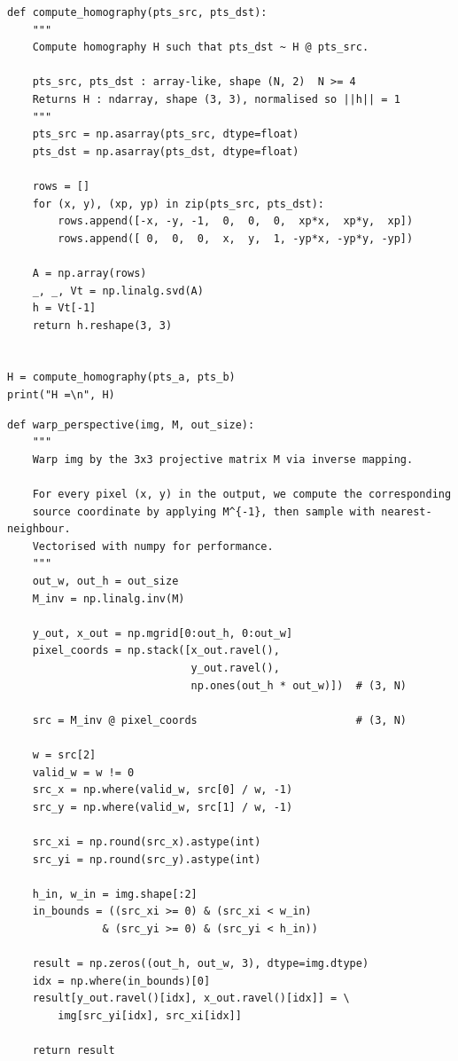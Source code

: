 \documentclass[12pt,a4paper]{article}
\begin{document}
\begin{lstlisting}[caption={Cálculo da homografia via DLT/SVD.}]
def compute_homography(pts_src, pts_dst):
    """
    Compute homography H such that pts_dst ~ H @ pts_src.

    pts_src, pts_dst : array-like, shape (N, 2)  N >= 4
    Returns H : ndarray, shape (3, 3), normalised so ||h|| = 1
    """
    pts_src = np.asarray(pts_src, dtype=float)
    pts_dst = np.asarray(pts_dst, dtype=float)

    rows = []
    for (x, y), (xp, yp) in zip(pts_src, pts_dst):
        rows.append([-x, -y, -1,  0,  0,  0,  xp*x,  xp*y,  xp])
        rows.append([ 0,  0,  0,  x,  y,  1, -yp*x, -yp*y, -yp])

    A = np.array(rows)
    _, _, Vt = np.linalg.svd(A)
    h = Vt[-1]
    return h.reshape(3, 3)


H = compute_homography(pts_a, pts_b)
print("H =\n", H)
\end{lstlisting}

\begin{lstlisting}[caption={Warping manual por mapeamento inverso.}]
def warp_perspective(img, M, out_size):
    """
    Warp img by the 3x3 projective matrix M via inverse mapping.

    For every pixel (x, y) in the output, we compute the corresponding
    source coordinate by applying M^{-1}, then sample with nearest-neighbour.
    Vectorised with numpy for performance.
    """
    out_w, out_h = out_size
    M_inv = np.linalg.inv(M)

    y_out, x_out = np.mgrid[0:out_h, 0:out_w]
    pixel_coords = np.stack([x_out.ravel(),
                             y_out.ravel(),
                             np.ones(out_h * out_w)])  # (3, N)

    src = M_inv @ pixel_coords                         # (3, N)

    w = src[2]
    valid_w = w != 0
    src_x = np.where(valid_w, src[0] / w, -1)
    src_y = np.where(valid_w, src[1] / w, -1)

    src_xi = np.round(src_x).astype(int)
    src_yi = np.round(src_y).astype(int)

    h_in, w_in = img.shape[:2]
    in_bounds = ((src_xi >= 0) & (src_xi < w_in)
               & (src_yi >= 0) & (src_yi < h_in))

    result = np.zeros((out_h, out_w, 3), dtype=img.dtype)
    idx = np.where(in_bounds)[0]
    result[y_out.ravel()[idx], x_out.ravel()[idx]] = \
        img[src_yi[idx], src_xi[idx]]

    return result
\end{lstlisting}
\end{document}
